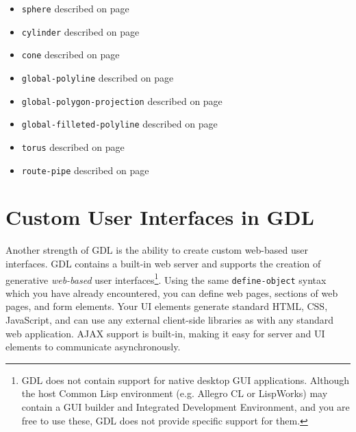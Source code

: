\documentclass [11pt]{book}
\begin{document}
\begin{itemize}

\item \texttt{sphere} described on page 
\pageref{prim:sphere}

\item \texttt{cylinder} described on page 
\pageref{prim:cylinder}

\item \texttt{cone} described on page 
\pageref{prim:cone}

\item \texttt{global-polyline} described on page 
\pageref{prim:global-polyline}

\item \texttt{global-polygon-projection} described on page 
\pageref{prim:global-polygon-projection}

\item \texttt{global-filleted-polyline} described on page 
\pageref{prim:global-polyline}

\item \texttt{torus} described on page 
\pageref{prim:torus}

\item \texttt{route-pipe} described on page 
\pageref{prim:route-pipe}

\end{itemize}



\chapter{Custom User Interfaces in GDL}

\label{chap:customuserinterfacesingdl}



Another strength of GDL is the ability to create custom
web-based user interfaces. GDL contains a built-in web server and
supports the creation of generative \emph{web-based} user interfaces\footnote{GDL does not contain support for native desktop
GUI applications. Although the host Common Lisp
environment (e.g. Allegro CL or LispWorks) may contain a GUI builder
and Integrated Development Environment, and you are free to use these,
GDL does not provide specific support for them.}. Using the same \texttt{define-object} syntax which you have already encountered, you can define
web pages, sections of web pages, and form elements.
Your UI elements generate standard HTML, CSS, JavaScript, and can use
any external client-side libraries as with any standard web application.  AJAX support is
built-in, making it easy for server and UI elements to communicate asynchronously.
\end{document}
